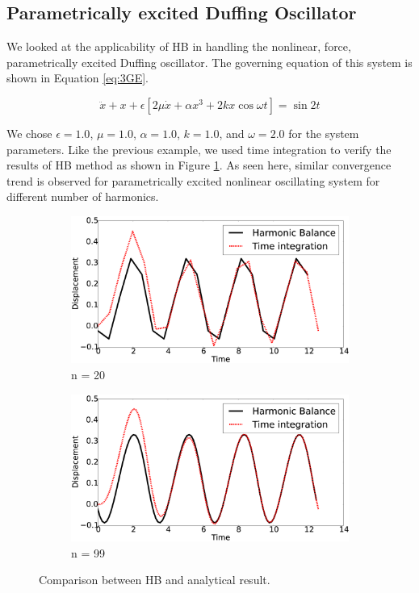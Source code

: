 \documentclass[12pt, a4paper]{extarticle}
\begin{document}
\subsection{Parametrically excited Duffing Oscillator}
We looked at the applicability of HB in handling the nonlinear, force, parametrically excited Duffing oscillator. The governing equation of this system is shown in Equation \eqref{eq:3GE}.

\begin{equation}\label{eq:3GE}
	\ddot{x} + x + \epsilon \left[ 2 \mu \dot{x} + \alpha x^3 + 2 k x \cos \omega t \right] = \sin 2t	
\end{equation}

We chose $\epsilon = 1.0$, $\mu = 1.0$, $\alpha = 1.0$, $k = 1.0$, and $\omega = 2.0$ for the system parameters. Like the previous example, we used time integration to verify the results of HB method as shown in Figure \ref{fig:R3}. As seen here, similar convergence trend is observed for parametrically excited nonlinear oscillating system for different number of harmonics.

\begin{figure}[h]
	\centering
	\begin{subfigure}[h]{8.0 cm}
		\includegraphics[width=8.0 cm]{figure/3N20.eps}
		\caption{n = 20}
	\end{subfigure}
	\begin{subfigure}[h]{8.0 cm}
        \includegraphics[width=8.0 cm]{figure/3N99.eps}
		\caption{n = 99}
    \end{subfigure}
    \caption{Comparison between HB and analytical result.}
    \label{fig:R3}
\end{figure}
\end{document}
